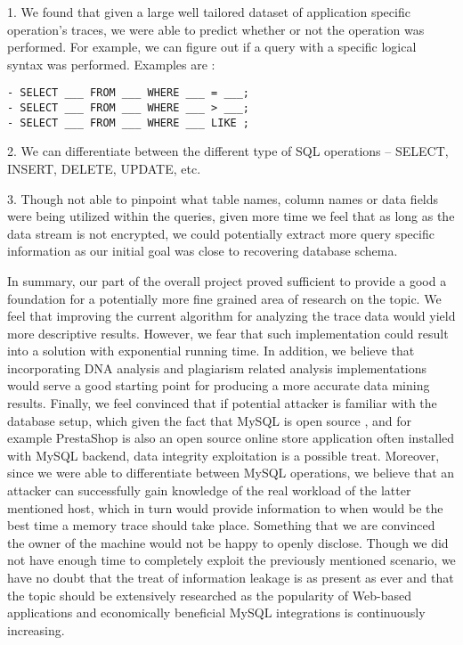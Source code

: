 \documentclass[11pt,a4paper, titlepage, oneside]{article}
\begin{document}
1. We found that given a large well tailored dataset of application specific operation's traces, we were able to predict whether or not the operation was performed. For example, we can figure out if a query with a specific logical syntax was performed. Examples are :
\begin{verbatim}
- SELECT ___ FROM ___ WHERE ___ = ___; 
- SELECT ___ FROM ___ WHERE ___ > ___;
- SELECT ___ FROM ___ WHERE ___ LIKE ;
\end{verbatim}
2. We can differentiate between the different type of SQL operations – SELECT, INSERT, DELETE, UPDATE, etc.
      
3. Though not able to pinpoint what table names, column names or data fields were being utilized within the queries, given more time we feel that as long as the data stream is not encrypted, we could potentially extract more query specific information as our initial goal was close to recovering database schema.

In summary, our part of the overall project proved sufficient to provide a good a foundation for a potentially more fine grained area of research on the topic. We feel that improving the current algorithm for analyzing the trace data would yield more descriptive results. However, we fear that such implementation could result into a solution with exponential running time. In addition, we believe that incorporating DNA analysis and plagiarism related analysis implementations would serve a good starting point for producing a more accurate data mining results. Finally, we feel convinced that if potential attacker is familiar with the database setup, which given the fact that MySQL is open source , and for example PrestaShop is also an open source online store application often installed with MySQL backend, data integrity exploitation is a possible treat. Moreover, since we were able to differentiate between MySQL operations, we believe that an attacker can successfully gain knowledge of the real workload of the latter mentioned host, which in turn would provide information to when would be the best time a memory trace should take place. Something that we are convinced the owner of the machine would not be happy to openly disclose. Though we did not have enough time to completely exploit the previously mentioned scenario, we have no doubt that the treat of information leakage is as present as ever and that the topic should be extensively researched as the popularity of Web-based applications and economically beneficial MySQL integrations is continuously increasing.
\end{document}
